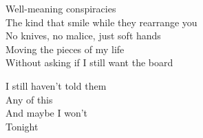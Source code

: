 \begin{lyrics}
Well-meaning conspiracies\\
The kind that smile while they rearrange you\\
No knives, no malice, just soft hands\\
Moving the pieces of my life\\
Without asking if I still want the board

I still haven’t told them\\
Any of this\\
And maybe I won’t\\
Tonight
\end{lyrics}

